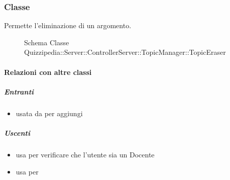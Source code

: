 \subsubsection{Classe }
Permette l'eliminazione di un argomento.
\begin{figure}[H]
\centering
\noindent{}
\caption[Schema Classe TopicEraser]{Schema Classe Quizzipedia::Server::ControllerServer::TopicManager::TopicEraser}
\end{figure}
\paragraph{Relazioni con altre classi}
\subparagraph{Entranti}
\begin{itemize}
\item usata da  per aggiungi
\end{itemize}
\subparagraph{Uscenti}
\begin{itemize}
\item usa  per verificare che l'utente sia un Docente
\item usa  per 
\end{itemize}
